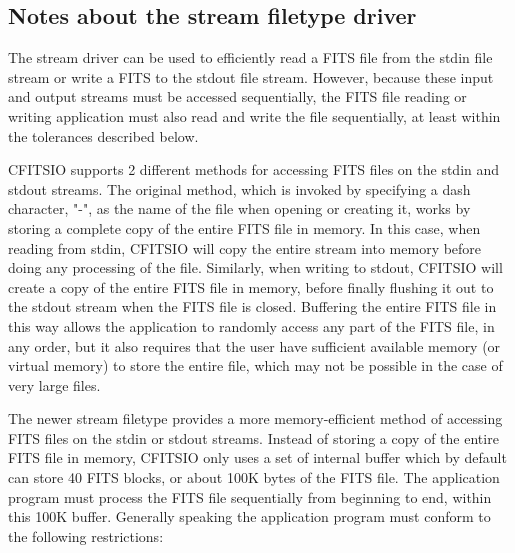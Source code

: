 \documentclass[11pt]{book}
\begin{document}
\subsection{Notes about the stream filetype driver}

The stream driver can be used to efficiently read a FITS file from the stdin
file stream or write a FITS to the stdout file stream.  However, because these
input and output streams must be accessed sequentially, the FITS file reading or
writing application must also read and write the file sequentially, at least
within the tolerances described below.

CFITSIO supports 2 different methods for accessing FITS files on the stdin and
stdout streams.  The original method, which is invoked by specifying a dash
character, "-", as the name of the file when opening or creating it, works by
storing a complete copy of the entire FITS file in memory.  In this case, when
reading from stdin, CFITSIO will copy the entire stream into memory before doing
any processing of the file.  Similarly, when writing to stdout, CFITSIO will
create a copy of the entire FITS file in memory, before finally flushing it out
to  the stdout stream when the FITS file is closed.  Buffering the entire FITS
file in this way allows the application to randomly access any part of the FITS
file, in any order, but it also requires that the user have sufficient available
memory (or virtual memory) to store the entire file, which may not be possible
in the case of very large files.

The newer stream filetype provides a more memory-efficient method of accessing
FITS files on the stdin or stdout streams.  Instead of storing a copy of the
entire FITS file in memory, CFITSIO only uses a set of internal  buffer which by
default can store  40 FITS blocks, or about  100K bytes of the FITS file.  The
application program must process the FITS file sequentially from beginning to
end, within this 100K buffer.  Generally speaking the application  program must
conform to the following restrictions:
\end{document}

